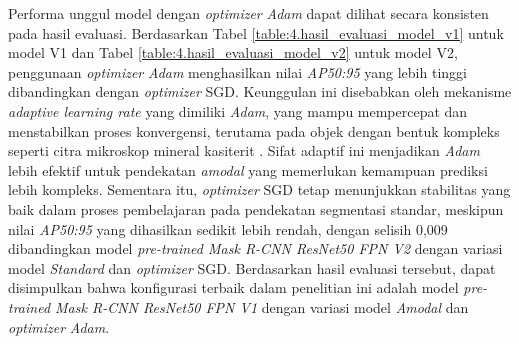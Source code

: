 Performa unggul model dengan \textit{optimizer} \textit{Adam} dapat dilihat secara konsisten pada hasil evaluasi. Berdasarkan Tabel \ref{table:4.hasil_evaluasi_model_v1} untuk model V1 dan Tabel \ref{table:4.hasil_evaluasi_model_v2} untuk model V2, penggunaan \textit{optimizer} \textit{Adam} menghasilkan nilai \textit{AP50:95} yang lebih tinggi dibandingkan dengan \textit{optimizer} SGD. Keunggulan ini disebabkan oleh mekanisme \textit{adaptive learning rate} yang dimiliki \textit{Adam}, yang mampu mempercepat dan menstabilkan proses konvergensi, terutama pada objek dengan bentuk kompleks seperti citra mikroskop mineral kasiterit \cite{optimizer}. Sifat adaptif ini menjadikan \textit{Adam} lebih efektif untuk pendekatan \textit{amodal} yang memerlukan kemampuan prediksi lebih kompleks. Sementara itu, \textit{optimizer} SGD tetap menunjukkan stabilitas yang baik dalam proses pembelajaran pada pendekatan segmentasi standar, meskipun nilai \textit{AP50:95} yang dihasilkan sedikit lebih rendah, dengan selisih 0{,}009 dibandingkan model \textit{pre-trained Mask R-CNN ResNet50 FPN V2} dengan variasi model \textit{Standard} dan \textit{optimizer} SGD. Berdasarkan hasil evaluasi tersebut, dapat disimpulkan bahwa konfigurasi terbaik dalam penelitian ini adalah model \textit{pre-trained Mask R-CNN ResNet50 FPN V1} dengan variasi model \textit{Amodal} dan \textit{optimizer} \textit{Adam}. \par

\begin{table}[H]
\centering
\caption{Hasil Perbandingan Penerapan Amodal}
\label{table:4.perbandingan_penerapan_amodal}
\small
{}
\end{table}

